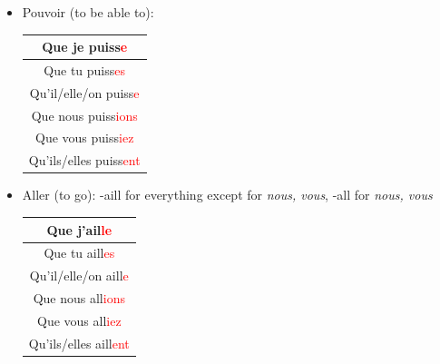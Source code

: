 \documentclass{book}
\begin{document}
\begin{enumerate}
\begin{itemize}
                    \item Pouvoir (to be able to):
                        \begin{center}
                            \begin{tabular}{|c|}
                                \hline
                                Que je puiss\textcolor{red}{e} \\
                                \hline
                                Que tu puiss\textcolor{red}{es} \\
                                \hline
                                Qu'il/elle/on puiss\textcolor{red}{e} \\
                                \hline
                                Que nous puiss\textcolor{red}{ions} \\
                                \hline
                                Que vous puiss\textcolor{red}{iez} \\
                                \hline
                                Qu'ils/elles puiss\textcolor{red}{ent} \\
                                \hline
                            \end{tabular}
                        \end{center}

                    \item Aller (to go): -aill for everything except for \textit{nous, vous}, -all for \textit{nous, vous}
                        \begin{center}
                            \begin{tabular}{|c|}
                                \hline
                                Que j'ail\textcolor{red}{le} \\
                                \hline
                                Que tu aill\textcolor{red}{es} \\
                                \hline
                                Qu'il/elle/on aill\textcolor{red}{e} \\
                                \hline
                                Que nous all\textcolor{red}{ions} \\
                                \hline
                                Que vous all\textcolor{red}{iez} \\
                                \hline
                                Qu'ils/elles aill\textcolor{red}{ent} \\
                                \hline
                            \end{tabular}
                        \end{center}


\end{itemize}
\end{enumerate}
\end{document}
